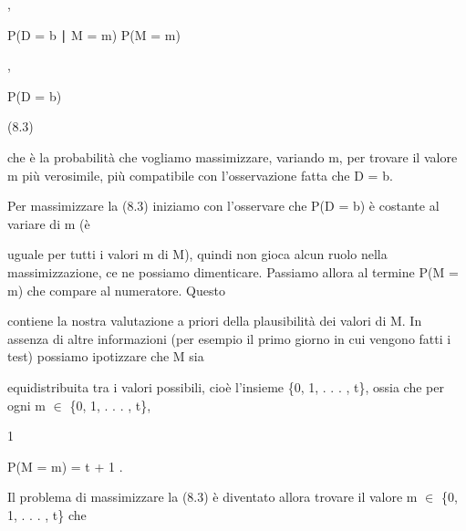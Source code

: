 \documentclass[a4paper,portrait,12pt]{article}
\begin{document}
,





\begin{flushleft}
P(D = b ∣ M = m) P(M = m)
\end{flushleft}


,


\begin{flushleft}
P(D = b)
\end{flushleft}





(8.3)





\begin{flushleft}
che \`{e} la probabilit\`{a} che vogliamo massimizzare, variando m, per trovare il valore m più verosimile, più compatibile con l'osservazione fatta che D = b.
\end{flushleft}


\begin{flushleft}
Per massimizzare la (8.3) iniziamo con l'osservare che P(D = b) \`{e} costante al variare di m (\`{e}
\end{flushleft}


\begin{flushleft}
uguale per tutti i valori m di M), quindi non gioca alcun ruolo nella massimizzazione, ce ne possiamo dimenticare. Passiamo allora al termine P(M = m) che compare al numeratore. Questo
\end{flushleft}


\begin{flushleft}
contiene la nostra valutazione a priori della plausibilit\`{a} dei valori di M. In assenza di altre informazioni (per esempio il primo giorno in cui vengono fatti i test) possiamo ipotizzare che M sia
\end{flushleft}


\begin{flushleft}
equidistribuita tra i valori possibili, cio\`{e} l'insieme \{0, 1, . . . , t\}, ossia che per ogni m $\in$ \{0, 1, . . . , t\},
\end{flushleft}


1


\begin{flushleft}
P(M = m) = t + 1 .
\end{flushleft}


\begin{flushleft}
Il problema di massimizzare la (8.3) \`{e} diventato allora trovare il valore m $\in$ \{0, 1, . . . , t\} che
\end{flushleft}
\end{document}
